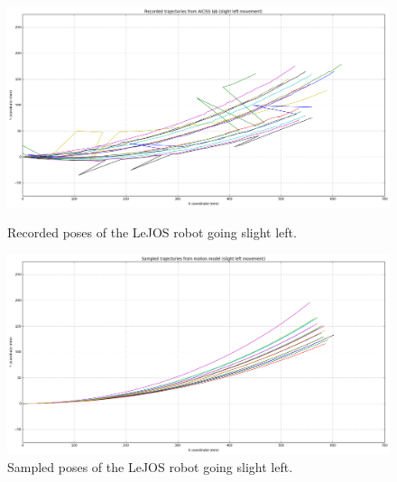 \documentclass[paper=a4, fontsize=11pt]{scrartcl} %
\begin{document}
    \begin{figure}[H]
    \centering
    \begin{minipage}{\textwidth}
        \centering
        \includegraphics[width=\textwidth]{images/recorded_poses_slight_left.png} %
        \caption{Recorded poses of the LeJOS robot going slight left.}
    \end{minipage}\hfill
    \begin{minipage}{\textwidth}
        \centering
        \includegraphics[width=1\textwidth]{images/sampled_poses_slightLeft.png} %
        \caption{Sampled poses of the LeJOS robot going slight left.}
    \end{minipage}
    \end{figure}
\end{document}
